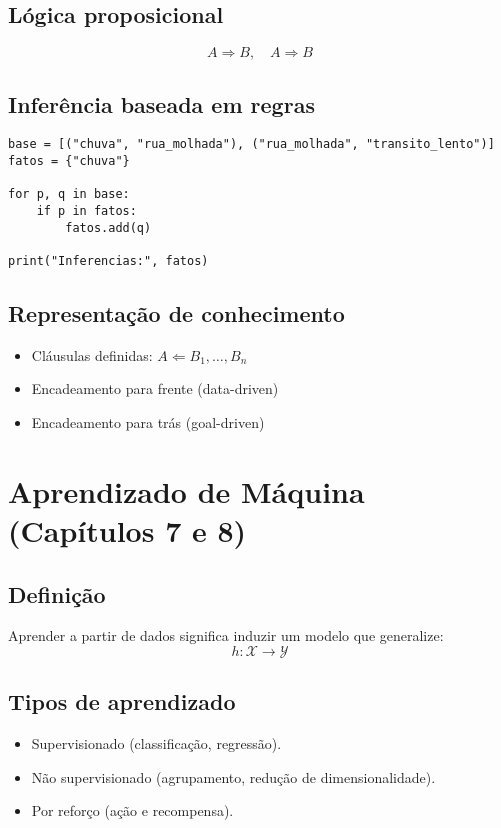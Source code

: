 \documentclass[9pt,a4paper]{extarticle}
\begin{document}
\subsection*{Lógica proposicional}
\[
A \Rightarrow B, \quad A
\Rightarrow B
\]

\subsection*{Inferência baseada em regras}
\begin{lstlisting}
base = [("chuva", "rua_molhada"), ("rua_molhada", "transito_lento")]
fatos = {"chuva"}

for p, q in base:
    if p in fatos:
        fatos.add(q)

print("Inferencias:", fatos)
\end{lstlisting}

\subsection*{Representação de conhecimento}
\begin{itemize}
  \item Cláusulas definidas: $A \Leftarrow B_1, \dots, B_n$
  \item Encadeamento para frente (data-driven)
  \item Encadeamento para trás (goal-driven)
\end{itemize}

\section{Aprendizado de Máquina (Capítulos 7 e 8)}

\subsection*{Definição}
Aprender a partir de dados significa induzir um modelo que generalize:
\[
h: \mathcal{X} \rightarrow \mathcal{Y}
\]

\subsection*{Tipos de aprendizado}
\begin{itemize}
  \item Supervisionado (classificação, regressão).
  \item Não supervisionado (agrupamento, redução de dimensionalidade).
  \item Por reforço (ação e recompensa).
\end{itemize}
\end{document}
